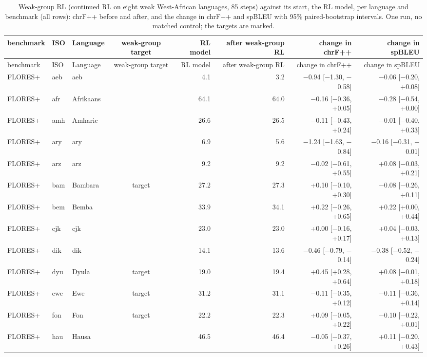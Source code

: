 {\scriptsize\setlength{\tabcolsep}{1.5pt}
\begin{longtable}{@{}lllcrrrr@{}}
\caption{Weak-group RL (continued RL on eight weak West-African languages, 85 steps) against its start, the RL model, per language and benchmark (all rows): chrF++ before and after, and the change in chrF++ and spBLEU with 95\% paired-bootstrap intervals. One run, no matched control; the targets are marked.}\label{tab:weak-per-language}\\
\toprule
benchmark & ISO & Language & weak-group target & RL model & after weak-group RL & change in chrF++ & change in spBLEU \\
\midrule\endfirsthead
\toprule
benchmark & ISO & Language & weak-group target & RL model & after weak-group RL & change in chrF++ & change in spBLEU \\
\midrule\endhead
\midrule\endfoot
\bottomrule\endlastfoot
FLORES+ & aeb & aeb &  & 4.1 & 3.2 & $-$0.94 [$-$1.30, $-$0.58] & $-$0.06 [$-$0.20, +0.08] \\
FLORES+ & afr & Afrikaans &  & 64.1 & 64.0 & $-$0.16 [$-$0.36, +0.05] & $-$0.28 [$-$0.54, +0.00] \\
FLORES+ & amh & Amharic &  & 26.6 & 26.5 & $-$0.11 [$-$0.43, +0.24] & $-$0.01 [$-$0.40, +0.33] \\
FLORES+ & ary & ary &  & 6.9 & 5.6 & $-$1.24 [$-$1.63, $-$0.84] & $-$0.16 [$-$0.31, $-$0.01] \\
FLORES+ & arz & arz &  & 9.2 & 9.2 & $-$0.02 [$-$0.61, +0.55] & +0.08 [$-$0.03, +0.21] \\
FLORES+ & bam & Bambara & target & 27.2 & 27.3 & +0.10 [$-$0.10, +0.30] & $-$0.08 [$-$0.26, +0.11] \\
FLORES+ & bem & Bemba &  & 33.9 & 34.1 & +0.22 [$-$0.26, +0.65] & +0.22 [+0.00, +0.44] \\
FLORES+ & cjk & cjk &  & 23.0 & 23.0 & +0.00 [$-$0.16, +0.17] & +0.04 [$-$0.03, +0.13] \\
FLORES+ & dik & dik &  & 14.1 & 13.6 & $-$0.46 [$-$0.79, $-$0.14] & $-$0.38 [$-$0.52, $-$0.24] \\
FLORES+ & dyu & Dyula & target & 19.0 & 19.4 & +0.45 [+0.28, +0.64] & +0.08 [$-$0.01, +0.18] \\
FLORES+ & ewe & Ewe & target & 31.2 & 31.1 & $-$0.11 [$-$0.35, +0.12] & $-$0.11 [$-$0.36, +0.14] \\
FLORES+ & fon & Fon & target & 22.2 & 22.3 & +0.09 [$-$0.05, +0.22] & $-$0.10 [$-$0.22, +0.01] \\
FLORES+ & hau & Hausa &  & 46.5 & 46.4 & $-$0.05 [$-$0.37, +0.26] & +0.11 [$-$0.20, +0.43] \\

\end{longtable}}
